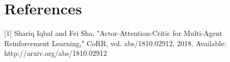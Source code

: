\documentclass[12pt]{article}
\begin{document}
\clearpage

\setcounter{page}{1}

\section{References}

[1] Shariq Iqbal and Fei Sha, "Actor-Attention-Critic for Multi-Agent Reinforcement Learning," CoRR, vol. abs/1810.02912, 2018. Available: http://arxiv.org/abs/1810.02912
\end{document}
